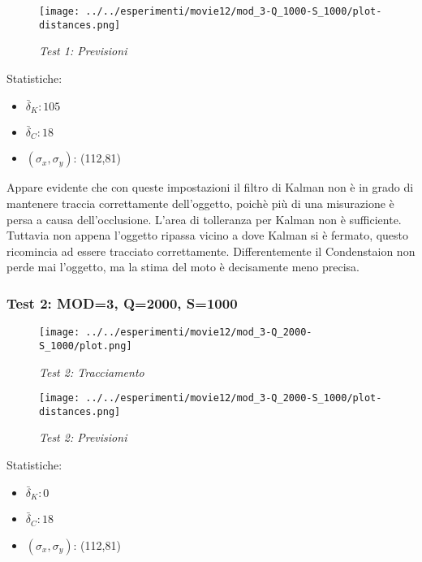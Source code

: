 \begin{figure}[hb]
\centering
	\texttt{[image: ../../esperimenti/movie12/mod\_3-Q\_1000-S\_1000/plot-distances.png]}
\caption{\textit{Test 1: Previsioni}}
\end{figure}

Statistiche:
\begin{itemize}
\item \begin{math} \bar \delta_K: 105 \end{math}
\item \begin{math} \bar \delta_C: 18 \end{math}
\item \begin{math}(\sigma_x,\sigma_y)\end{math}: (112,81)
\end{itemize}

Appare evidente che con queste impostazioni il filtro di Kalman non è in grado di mantenere traccia correttamente dell'oggetto, poichè più di una misurazione è persa a causa dell'occlusione. L'area di tolleranza per Kalman non è sufficiente. Tuttavia non appena l'oggetto ripassa vicino a dove Kalman si è fermato, questo ricomincia ad essere tracciato correttamente. Differentemente il Condenstaion non perde mai l'oggetto, ma la stima del moto è decisamente meno precisa.

\newpage

\subsubsection{Test 2: MOD=3, Q=2000, S=1000}

\begin{figure}[hb]
\centering
\texttt{[image: ../../esperimenti/movie12/mod\_3-Q\_2000-S\_1000/plot.png]}
\caption{\textit{Test 2: Tracciamento}}
\end{figure}

\begin{figure}[hb]
\centering
\texttt{[image: ../../esperimenti/movie12/mod\_3-Q\_2000-S\_1000/plot-distances.png]}
\caption{\textit{Test 2: Previsioni}}
\end{figure}

Statistiche:
\begin{itemize}
\item \begin{math} \bar \delta_K: 0 \end{math}
\item \begin{math} \bar \delta_C: 18 \end{math}
\item \begin{math}(\sigma_x,\sigma_y)\end{math}: (112,81)
\end{itemize}

